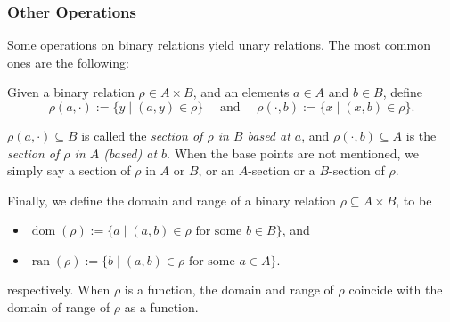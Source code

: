 \documentclass[12pt]{article}
\begin{document}
\subsubsection*{Other Operations}

Some operations on binary relations yield unary relations.  The most common ones are the following:

Given a binary relation $\rho\in A\times B$, and an elements $a\in A$ and $b\in B$, define 
$$\rho(a,\cdot):=\lbrace y\mid (a,y)\in \rho\rbrace 
\quad\mbox{ and }\quad
\rho(\cdot,b):=\lbrace x\mid (x,b)\in \rho\rbrace.$$

$\rho(a,\cdot)\subseteq B$ is called the \emph{section of $\rho$ in $B$ based at $a$}, and $\rho(\cdot,b)\subseteq A$ is the \emph{section of $\rho$ in $A$ (based) at $b$}.  When the base points are not mentioned, we simply say a section of $\rho$ in $A$ or $B$, or an $A$-section or a $B$-section of $\rho$.

Finally, we define the domain and range of a binary relation $\rho\subseteq A\times B$, to be 
\begin{itemize}
\item $\operatorname{dom}(\rho):=\lbrace a\mid (a,b)\in \rho \mbox{ for some } b\in B\rbrace$, and 
\item $\operatorname{ran}(\rho):=\lbrace b\mid (a,b)\in \rho \mbox{ for some } a\in A\rbrace.$
\end{itemize}
respectively.  When $\rho$ is a function, the domain and range of $\rho$ coincide with the domain of range of $\rho$ as a function.
\end{document}
